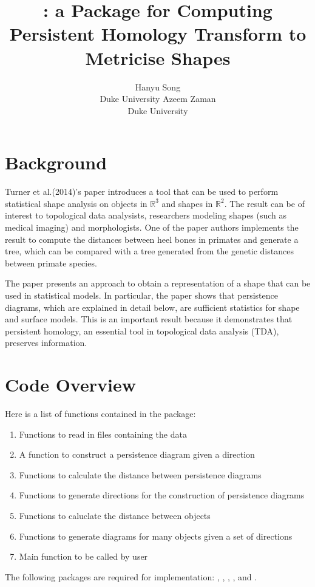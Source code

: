 \documentclass[codesnippet]{jss}
\author{Hanyu Song\\Duke University \And 
        Azeem Zaman\\Duke University}
\title{\pkg{PHT}: a \proglang{Python} Package for Computing Persistent Homology Transform to Metricise Shapes}
\begin{document}
\section[Background]{Background}Turner et al.(2014)'s paper introduces a tool that can be used to perform statistical shape analysis on objects in $\mathbb{R}^3$ and shapes in $\mathbb{R}^2$.  The result can be of interest to topological data analysists, researchers modeling shapes (such as medical imaging) and morphologists. One of the paper authors implements the result to compute the distances between heel bones in primates and generate a tree, which can be compared with a tree generated from the genetic distances between primate species.  

The paper presents an approach to obtain a representation of a shape that can be used in statistical models.  In particular, the paper shows that persistence diagrams, which are explained in detail below, are sufficient statistics for shape and surface models.  This is an important result because it demonstrates that persistent homology, an essential tool in topological data analysis (TDA), preserves information.  

\section[Code Overview]{Code Overview}
Here is a list of functions contained in the package:
\begin{enumerate}
\item{Functions to read in files containing the data}
\item{A function to construct a persistence diagram given a direction}
\item{Functions to calculate the distance between persistence diagrams}
\item{Functions to generate directions for the construction of persistence diagrams}
\item{Functions to caluclate the distance between objects}
\item{Functions to generate diagrams for many objects given a set of directions}
\item{Main function to be called by user}
\end{enumerate}
The following packages are required for implementation: , , , ,  and .
\end{document}
